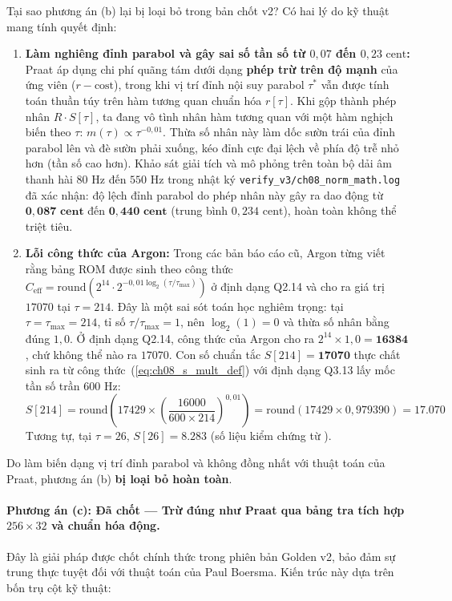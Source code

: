 Tại sao phương án (b) lại bị loại bỏ trong bản chốt v2? Có hai lý do kỹ thuật mang tính quyết định:
\begin{enumerate}[leftmargin=1.5em, itemsep=2pt]
    \item \textbf{Làm nghiêng đỉnh parabol và gây sai số tần số từ $0{,}07$ đến $0{,}23\text{ cent}$:} 
    Praat áp dụng chi phí quãng tám dưới dạng \textbf{phép trừ trên độ mạnh} của ứng viên ($r - \text{cost}$), trong khi vị trí đỉnh nội suy parabol $\tau^*$ vẫn được tính toán thuần túy trên hàm tương quan chuẩn hóa $r[\tau]$. 
    Khi gộp thành phép nhân $R \cdot S[\tau]$, ta đang vô tình nhân hàm tương quan với một hàm nghịch biến theo $\tau$: $m(\tau) \propto \tau^{-0{,}01}$. Thừa số nhân này làm dốc sườn trái của đỉnh parabol lên và đè sườn phải xuống, kéo đỉnh cực đại lệch về phía độ trễ nhỏ hơn (tần số cao hơn). 
    Khảo sát giải tích và mô phỏng trên toàn bộ dải âm thanh hài $80\text{ Hz}$ đến $550\text{ Hz}$ trong nhật ký \texttt{verify\_v3/ch08\_norm\_math.log} đã xác nhận: độ lệch đỉnh parabol do phép nhân này gây ra dao động từ $\mathbf{0{,}087\text{ cent}}$ đến $\mathbf{0{,}440\text{ cent}}$ (trung bình $0{,}234\text{ cent}$), hoàn toàn không thể triệt tiêu.
    \item \textbf{Lỗi công thức của Argon:}
    Trong các bản báo cáo cũ, Argon từng viết rằng bảng ROM được sinh theo công thức $C_{\text{eff}} = \text{round}(2^{14} \cdot 2^{-0{,}01 \log_2(\tau/\tau_{\max})})$ ở định dạng Q2.14 và cho ra giá trị $17070$ tại $\tau = 214$. 
    Đây là một sai sót toán học nghiêm trọng: tại $\tau = \tau_{\max} = 214$, tỉ số $\tau / \tau_{\max} = 1$, nên $\log_2(1) = 0$ và thừa số nhân bằng đúng $1{,}0$. Ở định dạng Q2.14, công thức của Argon cho ra $2^{14} \times 1{,}0 = \mathbf{16384}$, chứ không thể nào ra $17070$. Con số chuẩn tắc $S[214] = \mathbf{17070}$ thực chất sinh ra từ công thức~(\ref{eq:ch08_s_mult_def}) với định dạng Q3.13 lấy mốc tần số trần $600\text{ Hz}$:
    \begin{equation}
    S[214] = \text{round}\left( 17429 \times \left(\frac{16000}{600 \times 214}\right)^{0{,}01} \right) = \text{round}(17429 \times 0{,}979390) = \mathbf{17.070}
    \end{equation}
    Tương tự, tại $\tau = 26$, $S[26] = \mathbf{8.283}$ (số liệu kiểm chứng từ ).
\end{enumerate}
Do làm biến dạng vị trí đỉnh parabol và không đồng nhất với thuật toán của Praat, phương án (b) \textbf{bị loại bỏ hoàn toàn}.

\paragraph{Phương án (c): Đã chốt --- Trừ đúng như Praat qua bảng tra tích hợp $256 \times 32$ và chuẩn hóa động.}
Đây là giải pháp được chốt chính thức trong phiên bản Golden v2, bảo đảm sự trung thực tuyệt đối với thuật toán của Paul Boersma. Kiến trúc này dựa trên bốn trụ cột kỹ thuật:

